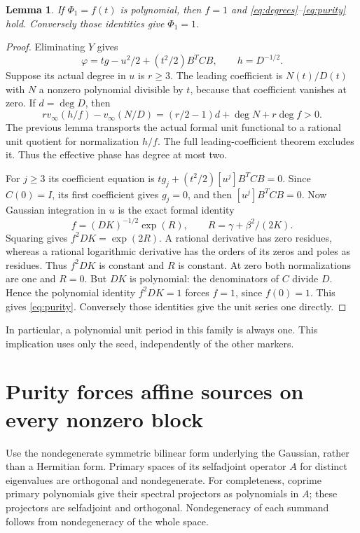 \documentclass[11pt]{article}
\newtheorem{lemma}[theorem]{Lemma}
\theoremstyle{definition}\newtheorem{definition}[theorem]{Definition}
\theoremstyle{remark}\newtheorem{remark}[theorem]{Remark}
\begin{document}
\begin{lemma}\label{lem:polynomialunit}
If $\Phi_1=f(t)$ is polynomial, then $f=1$ and
\eqref{eq:degrees}--\eqref{eq:purity} hold. Conversely those
identities give $\Phi_1=1$.
\end{lemma}
\begin{proof}
Eliminating $Y$ gives
\[
 \varphi=tg-u^2/2+(t^2/2)B^TCB,\qquad h=D^{-1/2}.
\]
Suppose its actual degree in $u$ is $r\ge3$. The leading
coefficient is $N(t)/D(t)$ with $N$ a nonzero polynomial
divisible by $t$, because that coefficient vanishes at zero.
If $d=\deg D$, then
\[
 r v_\infty(h/f)-v_\infty(N/D)
  =(r/2-1)d+\deg N+r\deg f>0.
\]
The previous lemma transports the actual formal unit functional
to a rational unit quotient for normalization $h/f$. The full
leading-coefficient theorem excludes it. Thus the effective
phase has degree at most two.

For $j\ge3$ its coefficient equation is
$tg_j+(t^2/2)[u^j]B^TCB=0$. Since $C(0)=I$, its first
coefficient gives $g_j=0$, and then $[u^j]B^TCB=0$.
Now Gaussian integration in $u$ is the exact formal identity
\[
 f=(DK)^{-1/2}\exp(R),\qquad R=\gamma+\beta^2/(2K).
\]
Squaring gives $f^2DK=\exp(2R)$. A rational derivative has
zero residues, whereas a rational logarithmic derivative has
the orders of its zeros and poles as residues. Thus $f^2DK$
is constant and $R$ is constant. At zero both normalizations
are one and $R=0$. But $DK$ is polynomial: the denominators
of $C$ divide $D$. Hence the polynomial identity $f^2DK=1$
forces $f=1$, since $f(0)=1$. This gives \eqref{eq:purity}.
Conversely those identities give the unit series one directly.
\end{proof}

In particular, a polynomial unit period in this family is always one.
This implication uses only the seed, independently of the other markers.

\section{Purity forces affine sources on every nonzero block}

Use the nondegenerate symmetric bilinear form underlying the
Gaussian, rather than a Hermitian form. Primary spaces of its
selfadjoint operator $A$ for distinct eigenvalues are orthogonal
and nondegenerate. For completeness, coprime primary polynomials
give their spectral projectors as polynomials in $A$; these
projectors are selfadjoint and orthogonal. Nondegeneracy of each
summand follows from nondegeneracy of the whole space.
\end{document}
